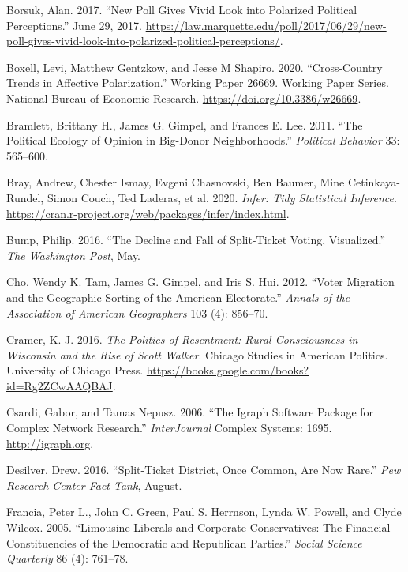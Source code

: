 \documentclass[12pt,]{article}
\begin{document}
\leavevmode\hypertarget{ref-borsuk2017}{}%
Borsuk, Alan. 2017. ``New Poll Gives Vivid Look into Polarized Political
Perceptions.'' June 29, 2017.
\url{https://law.marquette.edu/poll/2017/06/29/new-poll-gives-vivid-look-into-polarized-political-perceptions/}.

\leavevmode\hypertarget{ref-boxell2020}{}%
Boxell, Levi, Matthew Gentzkow, and Jesse M Shapiro. 2020.
``Cross-Country Trends in Affective Polarization.'' Working Paper 26669.
Working Paper Series. National Bureau of Economic Research.
\url{https://doi.org/10.3386/w26669}.

\leavevmode\hypertarget{ref-bramlett2011}{}%
Bramlett, Brittany H., James G. Gimpel, and Frances E. Lee. 2011. ``The
Political Ecology of Opinion in Big-Donor Neighborhoods.''
\emph{Political Behavior} 33: 565--600.

\leavevmode\hypertarget{ref-infer}{}%
Bray, Andrew, Chester Ismay, Evgeni Chasnovski, Ben Baumer, Mine
Cetinkaya-Rundel, Simon Couch, Ted Laderas, et al. 2020. \emph{Infer:
Tidy Statistical Inference}.
\url{https://cran.r-project.org/web/packages/infer/index.html}.

\leavevmode\hypertarget{ref-bump2016}{}%
Bump, Philip. 2016. ``The Decline and Fall of Split-Ticket Voting,
Visualized.'' \emph{The Washington Post}, May.

\leavevmode\hypertarget{ref-cho2012}{}%
Cho, Wendy K. Tam, James G. Gimpel, and Iris S. Hui. 2012. ``Voter
Migration and the Geographic Sorting of the American Electorate.''
\emph{Annals of the Association of American Geographers} 103 (4):
856--70.

\leavevmode\hypertarget{ref-cramer2016}{}%
Cramer, K. J. 2016. \emph{The Politics of Resentment: Rural
Consciousness in Wisconsin and the Rise of Scott Walker}. Chicago
Studies in American Politics. University of Chicago Press.
\url{https://books.google.com/books?id=Rg2ZCwAAQBAJ}.

\leavevmode\hypertarget{ref-igraph}{}%
Csardi, Gabor, and Tamas Nepusz. 2006. ``The Igraph Software Package for
Complex Network Research.'' \emph{InterJournal} Complex Systems: 1695.
\url{http://igraph.org}.

\leavevmode\hypertarget{ref-desilver2016}{}%
Desilver, Drew. 2016. ``Split-Ticket District, Once Common, Are Now
Rare.'' \emph{Pew Research Center Fact Tank}, August.

\leavevmode\hypertarget{ref-francia2005}{}%
Francia, Peter L., John C. Green, Paul S. Herrnson, Lynda W. Powell, and
Clyde Wilcox. 2005. ``Limousine Liberals and Corporate Conservatives:
The Financial Constituencies of the Democratic and Republican Parties.''
\emph{Social Science Quarterly} 86 (4): 761--78.
\end{document}
